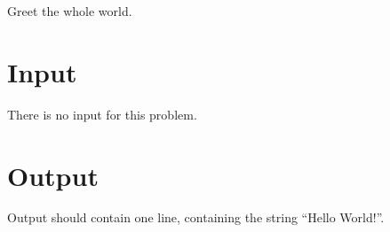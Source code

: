 
Greet the whole world.

\section*{Input}

There is no input for this problem.

\section*{Output}

Output should contain one line, containing the string “Hello World!”.
